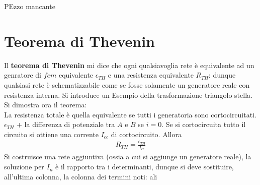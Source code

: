 \documentclass[a4paper, oneside]{article}
\begin{document}
PEzzo mancante

\section{Teorema di Thevenin}
Il \textbf{teorema di Thevenin} mi dice che ogni qualsiavoglia 
rete è equivalente ad un genratore di $fem$ equivalente $\epsilon_{TH}$ e 
una resistenza equivalente $R_{TH}$: dunque qualsiasi rete è schematizzabile 
come se fosse solamente un generatore reale con resistenza interna. 
Si introduce un Esempio della trasformazione triangolo stella. 
Si dimostra ora il teorema: \\
La resistenza totale è quella
equivalente se tutti i generatoria sono cortocircuitati. $\epsilon_{TH}$ + la differenza di potenziale 
tra $A$ e $B$ se $i = 0$. Se si cortocircuita tutto il circuito si ottiene una corrente
$I_{cc}$ di cortocircuito. Allora 
\begin{align}
    R_{TH} = \frac{\epsilon_{TH}}{I_{cc}}
\end{align}
Si costruisce una rete aggiuntiva (ossia a cui si aggiunge un generatore reale), 
la soluzione per $I_n$ è il rapporto tra i determinanti, dunque si deve sostituire,
all'ultima colonna, la colonna dei termini noti:
ali
\end{document}
